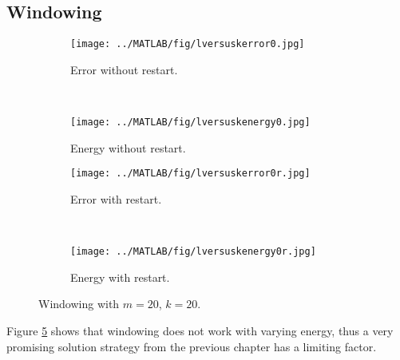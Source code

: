 \subsection{Windowing}%
\begin{figure}[H]
        \centering
        \begin{subfigure}[b]{0.3\textwidth}
                \texttt{[image: ../MATLAB/fig/lversuskerror0.jpg]}
                \caption{ Error without restart. }
                \label{fig:lversuskerror0}
        \end{subfigure}
		~
		\begin{subfigure}[b]{0.3\textwidth}
                \texttt{[image: ../MATLAB/fig/lversuskenergy0.jpg]}
                \caption{ Energy without restart. }
                \label{fig:lversuskenergy0}
        \end{subfigure}
        
		\begin{subfigure}[b]{0.3\textwidth}
                \texttt{[image: ../MATLAB/fig/lversuskerror0r.jpg]}
                \caption{ Error with restart. }
                \label{fig:lversuskerror0r}
        \end{subfigure}
		~
		\begin{subfigure}[b]{0.3\textwidth}
                \texttt{[image: ../MATLAB/fig/lversuskenergy0r.jpg]}
                \caption{ Energy with restart. }
                \label{fig:lversuskenergy0r}
        \end{subfigure}
                \caption{ Windowing with $m = 20$, $k = 20$.}
        \label{fig:lversuskenergy}
\end{figure}
\noindent Figure \ref{fig:lversuskenergy} shows that windowing does not work with varying energy, thus a very promising solution strategy from the previous chapter has a limiting factor.\\

